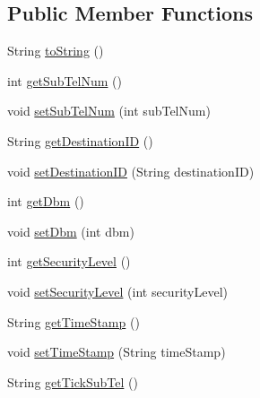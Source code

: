 \subsection*{Public Member Functions}
\begin{DoxyCompactItemize}
\item 
String \hyperlink{classch_1_1bfh_1_1gr33nopo55um_1_1enocean_1_1telegram_1_1_radio_sub_tel_a2ebb85311efd33e64ded6f39de3a966d}{to\+String} ()
\item 
int \hyperlink{classch_1_1bfh_1_1gr33nopo55um_1_1enocean_1_1telegram_1_1_radio_sub_tel_a73fe5e70596f6af9ac9594abc45b1911}{get\+Sub\+Tel\+Num} ()
\item 
void \hyperlink{classch_1_1bfh_1_1gr33nopo55um_1_1enocean_1_1telegram_1_1_radio_sub_tel_a7e1b82f545add4ef23b330d63c58e174}{set\+Sub\+Tel\+Num} (int sub\+Tel\+Num)
\item 
String \hyperlink{classch_1_1bfh_1_1gr33nopo55um_1_1enocean_1_1telegram_1_1_radio_sub_tel_a0e0ceead171474f593b75b914d622e74}{get\+Destination\+ID} ()
\item 
void \hyperlink{classch_1_1bfh_1_1gr33nopo55um_1_1enocean_1_1telegram_1_1_radio_sub_tel_a7b2c0fa77869e58b88727cdd3f4fa92c}{set\+Destination\+ID} (String destination\+ID)
\item 
int \hyperlink{classch_1_1bfh_1_1gr33nopo55um_1_1enocean_1_1telegram_1_1_radio_sub_tel_a2a37e568970cf1a4c5280687833f7053}{get\+Dbm} ()
\item 
void \hyperlink{classch_1_1bfh_1_1gr33nopo55um_1_1enocean_1_1telegram_1_1_radio_sub_tel_ad7233be54d8ce342ea85155c5aa44e32}{set\+Dbm} (int dbm)
\item 
int \hyperlink{classch_1_1bfh_1_1gr33nopo55um_1_1enocean_1_1telegram_1_1_radio_sub_tel_aa5ce3c7c31de6d00e25d24396d522609}{get\+Security\+Level} ()
\item 
void \hyperlink{classch_1_1bfh_1_1gr33nopo55um_1_1enocean_1_1telegram_1_1_radio_sub_tel_a6c0a6eefeb8bb53b456988db51574360}{set\+Security\+Level} (int security\+Level)
\item 
String \hyperlink{classch_1_1bfh_1_1gr33nopo55um_1_1enocean_1_1telegram_1_1_radio_sub_tel_a1afa279ff67155444680d7e71fbbfd9a}{get\+Time\+Stamp} ()
\item 
void \hyperlink{classch_1_1bfh_1_1gr33nopo55um_1_1enocean_1_1telegram_1_1_radio_sub_tel_a9551f2a73a965b9753ab1d814d30586e}{set\+Time\+Stamp} (String time\+Stamp)
\item 
String \hyperlink{classch_1_1bfh_1_1gr33nopo55um_1_1enocean_1_1telegram_1_1_radio_sub_tel_a65f35c0bf4efbaeec260eb549fad09f6}{get\+Tick\+Sub\+Tel} ()

\end{DoxyCompactItemize}
